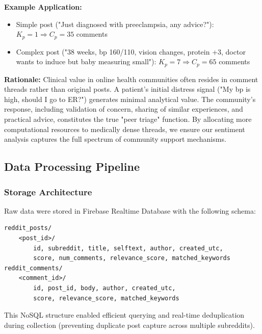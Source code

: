 \documentclass[12pt, a4paper]{article}
\begin{document}
\textbf{Example Application:}
\begin{itemize}
    \item Simple post ("Just diagnosed with preeclampsia, any advice?"): $K_p = 1 \Rightarrow C_p = 35$ comments
    \item Complex post ("38 weeks, bp 160/110, vision changes, protein +3, doctor wants to induce but baby measuring small"): $K_p = 7 \Rightarrow C_p = 65$ comments
\end{itemize}

\textbf{Rationale:} Clinical value in online health communities often resides in comment threads rather than original posts. A patient's initial distress signal ("My bp is high, should I go to ER?") generates minimal analytical value. The community's response, including validation of concern, sharing of similar experiences, and practical advice, constitutes the true "peer triage" function. By allocating more computational resources to medically dense threads, we ensure our sentiment analysis captures the full spectrum of community support mechanisms.

\subsection{Data Processing Pipeline}

\subsubsection{Storage Architecture}
Raw data were stored in Firebase Realtime Database with the following schema:
\begin{verbatim}
reddit_posts/
    <post_id>/
        id, subreddit, title, selftext, author, created_utc,
        score, num_comments, relevance_score, matched_keywords
reddit_comments/
    <comment_id>/
        id, post_id, body, author, created_utc, 
        score, relevance_score, matched_keywords
\end{verbatim}

This NoSQL structure enabled efficient querying and real-time deduplication during collection (preventing duplicate post capture across multiple subreddits).
\end{document}
